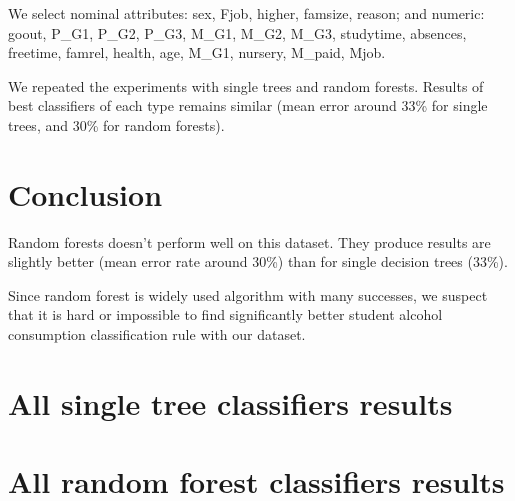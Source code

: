 \documentclass[a4paper]{article}
\begin{document}
We select nominal attributes:
sex,
Fjob,
higher,
famsize,
reason; and numeric:
goout,
P\_G1,
P\_G2,
P\_G3,
M\_G1,
M\_G2,
M\_G3,
studytime,
absences,
freetime,
famrel,
health,
age,
M\_G1,
nursery,
M\_paid,
Mjob.

We repeated the experiments with single trees and random forests.
Results of best classifiers of each type remains similar 
(mean error around 33\% for single trees, and 30\% for random forests).


\section{Conclusion}
Random forests doesn't perform well on this dataset.
They produce results are slightly better (mean error rate around 30\%)
than for single decision trees (33\%).

Since random forest is widely used algorithm with many successes, we suspect
that it is hard or impossible to find significantly better
student alcohol consumption classification rule
with our dataset.





\onecolumn
\newpage
\appendix
\section{All single tree classifiers results}
% 


\newpage
\section{All random forest classifiers results}
% 

\end{document}
